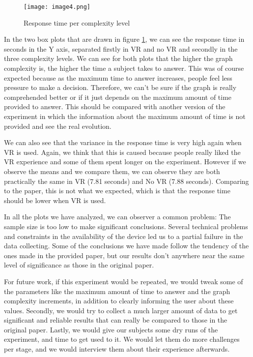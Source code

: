 \begin{figure}[!ht]
\centering
\texttt{[image: image4.png]}
\caption{Response time per complexity level} \label{fig:plot4}
\end{figure}

In the two box plots that are drawn in figure \ref{fig:plot4}, we can see the response time in seconds in the Y
axis, separated firstly in VR and no VR and secondly in the three
complexity levels. We can see for both plots that the higher the graph
complexity is, the higher the time a subject takes to answer. This
was of course expected because as the maximum time to answer increases,
people feel less pressure to make a decision. Therefore, we can't be
sure if the graph is really comprehended better or if it just
depends on the maximum amount of time provided to answer. This should
be compared with another version of the experiment in which the
information about the maximum amount of time is not provided and see the
real evolution.

We can also see that the variance in the response time is very high
again when VR is used. Again, we think that this is caused because
people really liked the VR experience and some of them spent longer on the experiment.
However if we observe the means and we compare them,
we can observe they are both practically the same in VR (7.81 seconds)
and No VR (7.88 seconds). Comparing to the paper, this is not what we
expected, which is that the response time should be lower when VR is used.

In all the plots we have analyzed, we can observer a common problem: The
sample size is too low to make significant conclusions. Several
technical problems and constraints in the availability of the device led
us to a partial failure in the data collecting. Some of the conclusions
we have made follow the tendency of the ones made in the provided
paper, but our results don't anywhere near the same level of significance as
those in the original paper.

For future work, if this experiment would be repeated, we would tweak
some of the parameters like the maximum amount of time to answer and the graph complexity increments, in addition to clearly informing the user about these values. Secondly, we would try to collect a much larger amount of data to get significant and reliable results that can really be compared to those in the original paper. Lastly, we would give our subjects some dry runs of the experiment, and time to get used to it. We would let them do more challenges per stage, and we would interview them about their experience afterwards.



